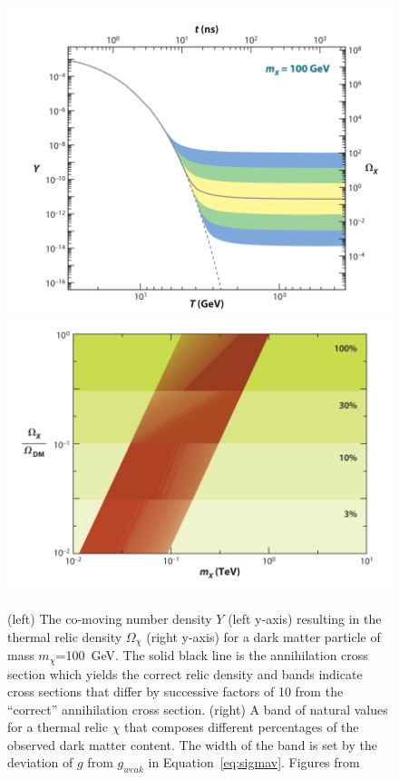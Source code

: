 \begin{figure}[htbp]
\begin{center}
\includegraphics[width=\halffig]{figures/theory/freezeout.png}
\includegraphics[width=\halffig]{figures/theory/wimp_miracle.png}
\caption{(left) The co-moving number density $Y$ (left y-axis) resulting in the thermal relic density $\Omega_{\chi}$ (right y-axis) for a dark matter particle of mass $m_{\chi}$=100~GeV. The solid black line is the annihilation cross section which yields the correct relic density and bands indicate cross sections that differ by successive factors of 10 from the ``correct'' annihilation cross section. (right) A band of natural values for a thermal relic $\chi$ that composes different percentages of the observed dark matter content. The width of the band is set by the deviation of $g$ from $g_{weak}$ in Equation~\ref{eq:sigmav}. Figures from \cite{Feng2010}}
\label{fig:wimp_miracle}
\end{center}
\end{figure}

